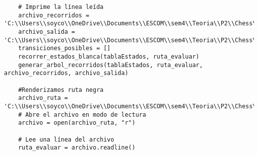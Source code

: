 \begin{lstlisting}
    # Imprime la línea leída
    archivo_recorridos = 'C:\\Users\\soyco\\OneDrive\\Documents\\ESCOM\\sem4\\Teoria\\P2\\Chess\\output\\recorridos_blanca.txt'
    archivo_salida = 'C:\\Users\\soyco\\OneDrive\\Documents\\ESCOM\\sem4\\Teoria\\P2\\Chess\\output\\arbol_blanca.dot'
    transiciones_posibles = []
    recorrer_estados_blanca(tablaEstados, ruta_evaluar)
    generar_arbol_recorridos(tablaEstados, ruta_evaluar, archivo_recorridos, archivo_salida)
    
    #Renderizamos ruta negra
    archivo_ruta = 'C:\\Users\\soyco\\OneDrive\\Documents\\ESCOM\\sem4\\Teoria\\P2\\Chess\\output\\ruta_negra.txt'
    # Abre el archivo en modo de lectura
    archivo = open(archivo_ruta, "r")

    # Lee una línea del archivo
    ruta_evaluar = archivo.readline()


\end{lstlisting}

